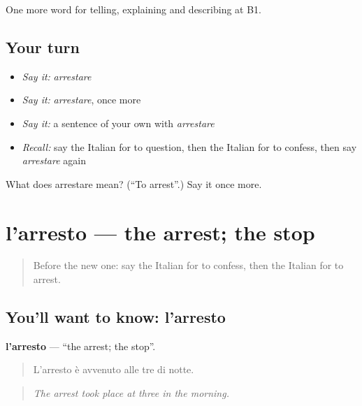 \begin{grammarlens}[title={What you've built}]
One more word for telling, explaining and describing at B1.
\end{grammarlens}

\subsection*{Your turn}
\begin{itemize}
\raggedright
  \item \emph{Say it:} \emph{arrestare}
  \item \emph{Say it:} \emph{arrestare}, once more
  \item \emph{Say it:} a sentence of your own with \emph{arrestare}
  \item \emph{Recall:} say the Italian for to question, then the Italian for to confess, then say \emph{arrestare} again
\end{itemize}

\begin{tcolorbox}[breakable,colback=teal!4,colframe=teal!35!black,title={Before you move on}]
What does arrestare mean? (\textquotedblleft{}To arrest\textquotedblright{}.) Say it once more.
\end{tcolorbox}
\section[l'arresto]{l'arresto — the arrest; the stop}

\label{lesson:IT-C297-arresto}



\begin{quote}
Before the new one: say the Italian for to confess, then the Italian for to arrest.
\end{quote}

\subsection*{You'll want to know: l'arresto}
\textbf{l'arresto} — \textquotedblleft{}the arrest; the stop\textquotedblright{}.

\begin{quote}
L'arresto è avvenuto alle tre di notte.
\end{quote}

\begin{quote}
\emph{The arrest took place at three in the morning.}
\end{quote}

